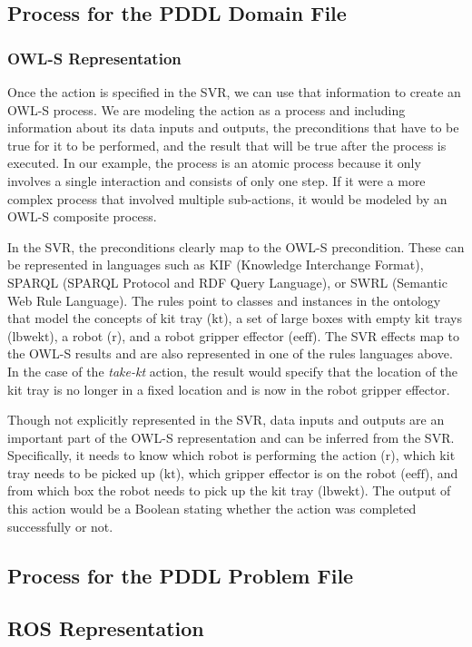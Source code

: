 \subsection{Process for the PDDL Domain File}
\label{subsect:PDDL_Domain_File}

\subsubsection{OWL-S Representation}
Once the action is specified in the SVR, we can use that information to create an OWL-S process. We are modeling the action as a process and including information about its data inputs and outputs, the preconditions that have to be true for it to be performed, and the result that will be true after the process is executed. In our example, the process is an atomic process because it only involves a single interaction and consists of only one step. If it were a more complex process that involved multiple sub-actions, it would be modeled by an OWL-S composite process.

In the SVR, the preconditions clearly map to the OWL-S precondition. These can be represented in languages such as KIF \cite{KIF} (Knowledge Interchange Format), SPARQL \cite{SPARQL} (SPARQL Protocol and RDF Query Language), or SWRL \cite{SWRL-W3C} (Semantic Web Rule Language). The rules point to classes and instances in the ontology that model the concepts of kit tray ($\mathrm{kt}$), a set of large boxes with empty kit trays ($\mathrm{lbwekt}$), a robot ($\mathrm{r}$), and a robot gripper effector ($\mathrm{eeff}$). The SVR effects map to the OWL-S results and are also represented in one of the rules languages above. In the case of the \textsl{take-kt} action, the result would specify that the location of the kit tray is no longer in a fixed location and is now in the robot gripper effector.

Though not explicitly represented in the SVR, data inputs and outputs are an important part of the OWL-S representation and can be inferred from the SVR. Specifically, it needs to know which robot is performing the action ($\mathrm{r}$), which kit tray needs to be picked up ($\mathrm{kt}$), which gripper effector is on the robot ($\mathrm{eeff}$), and from which box the robot needs to pick up the kit tray ($\mathrm{lbwekt}$). The output of this action would be a Boolean stating whether the action was completed successfully or not.

\subsection{Process for the PDDL Problem File}
\label{subsect:PDDL_Problem_File}


\subsection{ROS Representation} 
